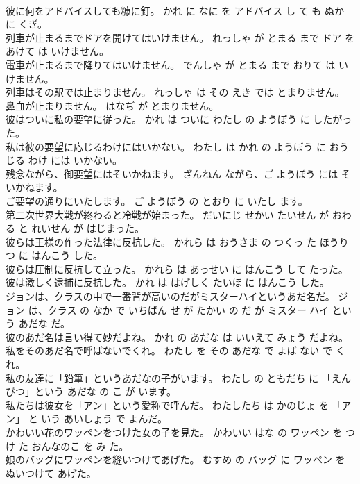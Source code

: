 \documentclass[8pt]{extreport}
\begin{document}
\begin{CJK}{UTF8}{min}
\\	彼に何をアドバイスしても糠に釘。	かれ に なに を アドバイス し て も ぬか に くぎ。	
\\	列車が止まるまでドアを開けてはいけません。	れっしゃ が とまる まで ドア を あけて は いけません。	
\\	電車が止まるまで降りてはいけません。	でんしゃ が とまる まで おりて は いけません。	
\\	列車はその駅では止まりません。	れっしゃ は その えき では とまりません。	
\\	鼻血が止まりません。	はなぢ が とまりません。	
\\	彼はついに私の要望に従った。	かれ は ついに わたし の ようぼう に したがった。	
\\	私は彼の要望に応じるわけにはいかない。	わたし は かれ の ようぼう に おうじる わけ には いかない。	
\\	残念ながら、御要望にはそいかねます。	ざんねん ながら、ご ようぼう には そいかねます。	
\\	ご要望の通りにいたします。	ご ようぼう の とおり に いたし ます。	
\\	第二次世界大戦が終わると冷戦が始まった。	だいにじ せかい たいせん が おわる と れいせん が はじまった。	
\\	彼らは王様の作った法律に反抗した。	かれら は おうさま の つくっ た ほうりつ に はんこう した。	
\\	彼らは圧制に反抗して立った。	かれら は あっせい に はんこう して たった。	
\\	彼は激しく逮捕に反抗した。	かれ は はげしく たいほ に はんこう した。	
\\	ジョンは、クラスの中で一番背が高いのだがミスターハイというあだ名だ。	ジョン は、クラス の なか で いちばん せ が たかい の だ が ミスター ハイ という あだな だ。	
\\	彼のあだ名は言い得て妙だよね。	かれ の あだな は いいえて みょう だよね。	
\\	私をそのあだ名で呼ばないでくれ。	わたし を その あだな で よば ない で くれ。	
\\	私の友達に「鉛筆」というあだなの子がいます。	わたし の ともだち に 「えんぴつ」という あだな の こ が います。	
\\	私たちは彼女を「アン」という愛称で呼んだ。	わたしたち は かのじょ を 「アン」 と いう あいしょう で よんだ。	
\\	かわいい花のワッペンをつけた女の子を見た。	かわいい はな の ワッペン を つけ た おんなのこ を み た。	
\\	娘のバッグにワッペンを縫いつけてあげた。	むすめ の バッグ に ワッペン を ぬいつけて あげた。	

\end{CJK}
\end{document}
